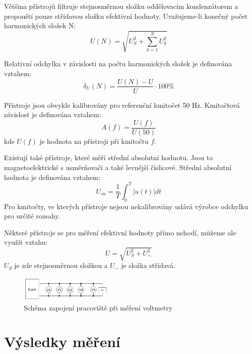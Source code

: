 \documentclass[a4paper, czech]{article}
\begin{document}
Většina přístrojů filtruje stejnosměrnou složku oddělovacím kondenzátorem a propouští pouze střídavou složku efektivní hodnoty.
Uvažujeme-li konečný počet harmonických složek N:
\begin{equation*}
    U \left(N\right) = \sqrt{U_S^2 + \sum_{k=1}^{N} U_k^2}
\end{equation*}

Relativní odchylka v závislosti na počtu harmonických složek je definována vztahem:
\begin{equation*}
    \delta_U \left(N\right) = \frac{U \left(N\right) - U}{U} \cdot 100\%
\end{equation*}

\pagebreak

Přístroje jsou obvykle kalibrovány pro referenční kmitočet 50 Hz. Kmitočtová závislost je definována vztahem:
\begin{equation*}
    A \left(f\right) = \frac{U\left(f\right)}{U\left(50\right)}
\end{equation*}
kde $U\left(f\right)$ je hodnota na přístroji při kmitočtu $f$.

Existují také přístroje, které měří střední absolutní hodnotu.
Jsou to magnetoelektrické s usměrňovači a také levnější číslicové.
Střední absolutní hodnota je definována vztahem:
\begin{equation*}
    U_{sa} = \frac{1}{T} \int_{0}^{T} \left|u\left(t\right)\right| dt
\end{equation*}
Pro kmitočty, ve kterých přístroje nejsou nekalibrovány udává výrobce odchylku pro určité rozsahy. 

Některé přístroje se pro měření efektivní hodnoty přímo nehodí, můžeme ale využít vztahu:
\begin{equation*}
    U = \sqrt{U_S^2 + U_{\sim}^2}
\end{equation*}
$U_S$ je zde stejnosměrnou složkou a $U_{\sim}$ je složka střídavá.

\begin{figure}[H]
    \centering
    \includegraphics[width=0.4\textwidth]{schema1.png}
    \caption{Schéma zapojení pracoviště při měření voltmetry}
\end{figure}

\section{Výsledky měření}
\end{document}

